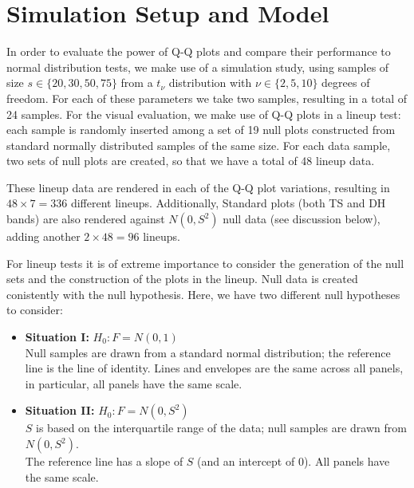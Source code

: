 \documentclass{article}\usepackage[]{graphicx}\usepackage[]{color}
\newcommand{\hh}[1]{{\color{magenta} #1}}
\begin{document}
\section{Simulation Setup and Model}\label{sec:simu}

\hh{In order to evaluate the power of Q-Q plots and compare their performance to normal distribution tests, we make use of a simulation study, 
using samples of size $s \in \{20, 30, 50, 75\}$ from a $t_\nu$ distribution with $\nu \in \{2, 5, 10\}$ degrees of freedom. For each of these parameters we take two samples, resulting in a total of 24 samples.
For the visual evaluation, we make use of Q-Q plots in a lineup test: each sample is randomly inserted among a set of 19 null plots constructed from standard normally distributed samples of the same size. For each data sample, two sets of null plots are created, so that we have a total of 48 lineup data. 

These lineup data are rendered in each of the Q-Q plot variations, resulting in $48 \times 7 = 336$ different lineups.  Additionally, Standard plots (both TS and DH bands) are also rendered against $N(0, S^2)$ null data (see discussion below), adding another $2 \times 48 = 96$ lineups.
}




For lineup tests it is of extreme importance to consider the generation of the null sets and the construction of the plots in the lineup. 
Null data is created conistently with the null hypothesis. Here, we have two different null hypotheses to consider:

\begin{itemize}
\item{\bf Situation I:}
$H_0: F = N(0,1)$  \\
Null samples are drawn from a standard normal distribution; the reference line is the line of identity. Lines and envelopes are the same across all panels, in particular, all panels have the same scale. 
\item{\bf Situation II:} $H_0: F = N(0,S^2)$ \\
$S$ is based on the interquartile range of the data; null samples are drawn from $N(0, S^2)$. \\
The reference line has a slope of $S$ (and an intercept of 0).  All panels have the same scale. 
\end{itemize}
\end{document}
